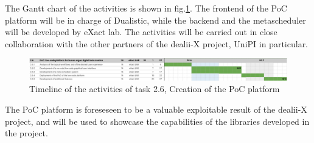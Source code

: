 \documentclass[a4paper,12pt]{article}
\begin{document}
The Gantt chart of the activities is shown in fig.\ref{gannt}. The frontend of the PoC platform will be in charge of Dualistic, while the backend and the metascheduler will be developed by eXact lab. The activities will be carried out in close collaboration with the other partners of the dealii-X project, UniPI in particular. 
\begin{figure}
    \includegraphics[width=400pt]{gantt.png}
    \caption{Timeline of the activities of task 2.6, Creation of the PoC platform}
    \label{gannt}
\end{figure}
The PoC platform is foreseseen to be a valuable exploitable result of the dealii-X project, and will be used to showcase the capabilities of the libraries developed in the project.

\label{MyLastPage}
\end{document}
